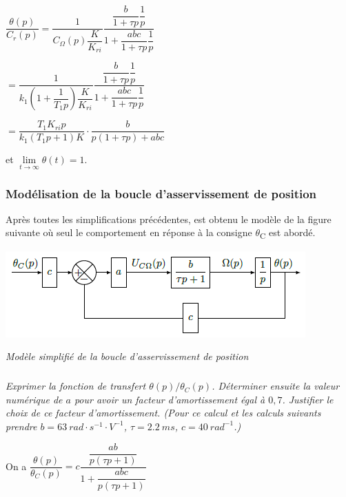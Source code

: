 \documentclass[10pt,fleqn]{article} %
\begin{document}
\begin{multicols}{2}
\begin{corrige}
$\dfrac{\theta(p)}{C_r(p)}=\dfrac{1}{C_{\Omega}(p)\dfrac{K}{K_{ri}}}\dfrac{\dfrac{b}{1+\tau p}\dfrac{1}{p}}{1+\dfrac{abc}{1+\tau p}\dfrac{1}{p}}$ 

$=\dfrac{1}{ k_{1}\left( 1 + \dfrac{1}{T_{1}p} \right)\dfrac{K}{K_{ri}}}\dfrac{\dfrac{b}{1+\tau p}\dfrac{1}{p}}{1+\dfrac{abc}{1+\tau p}\dfrac{1}{p}}$

$=\dfrac{T_{1}K_{ri}p}{ k_{1}\left( T_{1}p + 1 \right)K}\cdot \dfrac{b}{p\left(1+\tau p \right)+abc}$

et $\lim\limits_{t\to\infty} \theta(t) = 1$.
\end{corrige}
\else
\fi

\subsubsection*{Modélisation de la boucle d'asservissement de position}

Après toutes les simplifications précédentes, est obtenu le modèle de la
figure suivante où seul le comportement en réponse à la consigne
$\theta$\textsubscript{C} est abordé.


\begin{center}
\includegraphics[width=\linewidth]{images/image15.png}

\textit{Modèle simplifié de la boucle d'asservissement de
position \label{fig14}}
\end{center}


\subparagraph{}\textit{Exprimer la fonction de transfert $\theta(p)/\theta_C(p)$.
  Déterminer ensuite la valeur numérique de $a$ pour avoir un facteur
  d'amortissement égal à $0,7$. Justifier le choix de ce facteur
  d'amortissement. (Pour ce calcul et les calculs suivants prendre $b =
  \SI{63}{rad\cdot s^{-1}\cdot V^{-1}}$, $\tau= \SI{2,2}{ms}$, $c = \SI{40}{rad^{-1}}$.)}

\ifprof
\begin{corrige}
On a $\dfrac{\theta(p)}{\theta_C(p)}=c\dfrac{\dfrac{ab}{p\left( \tau p + 1\right)}}{1+\dfrac{abc}{p\left( \tau p + 1\right)}}$


\end{corrige}
\end{multicols}
\end{document}
